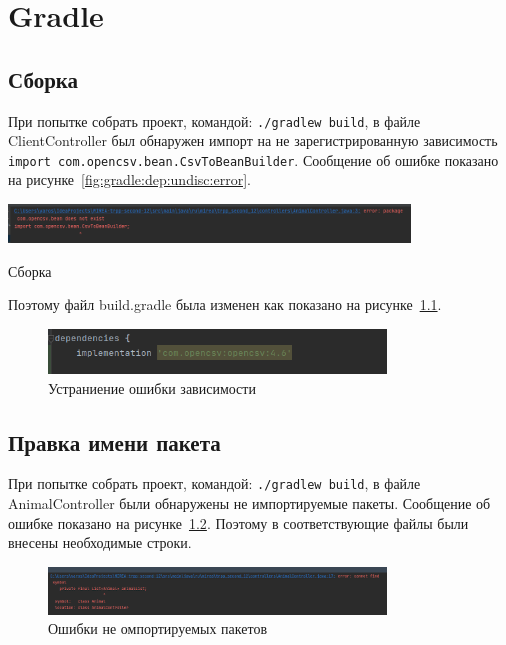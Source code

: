 \graphicspath{{./img}}
\chapter{Gradle}
\section{Сборка}
При попытке собрать проект, командой: \texttt{./gradlew~build},
в файле ClientController был обнаружен импорт на не зарегистрированную
зависимость \texttt{import~com.opencsv.bean.CsvToBeanBuilder}.
Сообщение об ошибке показано на рисунке~\ref{fig:gradle:dep:undisc:error}.

\begin{image}
	\includegraphics[width=0.8\textwidth]{png_1}
	\caption{Сборка}
	\label{fig:gradle:dep:undisc:error}
\end{image}

Поэтому файл build.gradle была изменен как показано
на рисунке~\ref{fig:gradle:dep:undisc:good}.

\begin{figure}[h!tp]
	\centering
	\includegraphics[width=0.8\textwidth]{Screenshot from 2023-03-12 17-25-18.png}
	\caption{Устраниение ошибки зависимости}
	\label{fig:gradle:dep:undisc:good}
\end{figure}

\section{Правка имени пакета}
При попытке собрать проект, командой: \texttt{./gradlew~build},
в файле AnimalController были обнаружены не импортируемые пакеты.
Сообщение об ошибке показано на рисунке~\ref{fig:gradle:imp:error}.
Поэтому в соответствующие файлы были внесены необходимые строки.

\begin{figure}[h!tp]
	\centering
	\includegraphics[width=0.8\textwidth]{png_3}
	\caption{Ошибки не омпортируемых пакетов}
	\label{fig:gradle:imp:error}
\end{figure}

